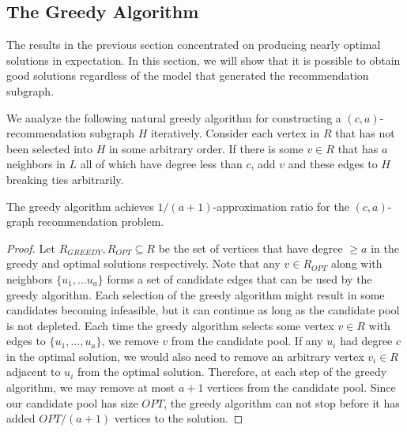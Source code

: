 \subsection{The Greedy Algorithm}
\label{greedy}
The results in the previous section concentrated on producing nearly
optimal solutions in expectation. In this section, we will show that
it is possible to obtain good solutions regardless of the model that
generated the recommendation subgraph. \vs

We analyze the following natural greedy algorithm for constructing a $(c,a)$-recommendation subgraph $H$ iteratively.
Consider each vertex in $R$ that has not been selected
into $H$ in some arbitrary order. If there is some $v \in R$ that has $a$ neighbors
in $L$ all of which have degree less than $c$, add $v$ and these edges to $H$ breaking
ties arbitrarily. 

\begin{thm}
The greedy algorithm achieves $1/(a+1)$-approximation ratio for the $(c,a)$-graph
recommendation problem.
\end{thm}
\begin{proof}
Let $R_{GREEDY}, R_{OPT}\subseteq R$ be the set of vertices that have
degree $\geq a$ in the greedy and optimal solutions respectively. Note
that any $v \in R_{OPT}$ along with neighbors $\{u_1,\ldots u_a\}$
forms a set of candidate edges that can be used by the greedy
algorithm. 
Each selection of the greedy algorithm might result in
some candidates becoming infeasible, but it can continue as long as the candidate pool is not depleted.
Each time the greedy algorithm selects some vertex $v\in
R$ with edges to $\{u_1,\ldots, u_a\}$, we remove $v$ from the candidate pool.
If any $u_i$ had degree $c$ in the optimal solution, we would also need to
remove an arbitrary vertex $v_i\in R$ adjacent to $u_i$ from the optimal
solution. 
Therefore, at each step of
the greedy algorithm, we may remove at most $a+1$ vertices from
the candidate pool. Since our candidate pool has size $OPT$, the
greedy algorithm can not stop before it has added $OPT/(a+1)$
vertices to the solution.
\end{proof}


